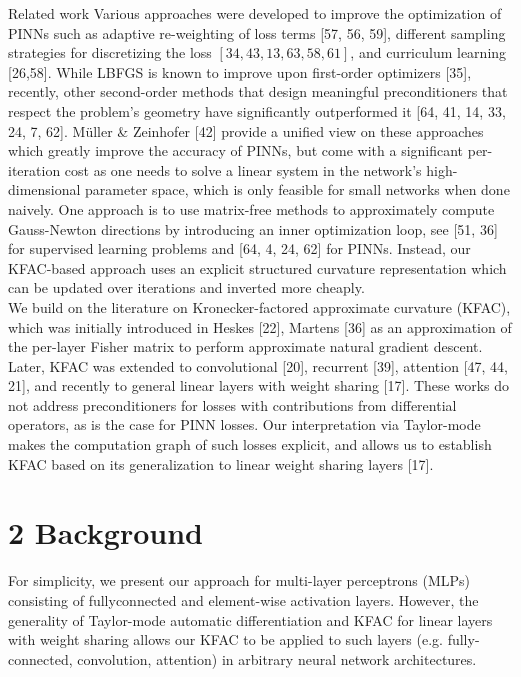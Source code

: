 \documentclass[10pt]{article}
\begin{document}
Related work Various approaches were developed to improve the optimization of PINNs such as adaptive re-weighting of loss terms [57, 56, 59], different sampling strategies for discretizing the loss $[34,43,13,63,58,61]$, and curriculum learning [26,58]. While LBFGS is known to improve upon first-order optimizers [35], recently, other second-order methods that design meaningful preconditioners that respect the problem's geometry have significantly outperformed it [64, 41, 14, 33, 24, 7, 62]. Müller \& Zeinhofer [42] provide a unified view on these approaches which greatly improve the accuracy of PINNs, but come with a significant per-iteration cost as one needs to solve a linear system in the network's high-dimensional parameter space, which is only feasible for small networks when done naively. One approach is to use matrix-free methods to approximately compute Gauss-Newton directions by introducing an inner optimization loop, see [51, 36] for supervised learning problems and [64, 4, 24, 62] for PINNs. Instead, our KFAC-based approach uses an explicit structured curvature representation which can be updated over iterations and inverted more cheaply.\\[0pt]
We build on the literature on Kronecker-factored approximate curvature (KFAC), which was initially introduced in Heskes [22], Martens [36] as an approximation of the per-layer Fisher matrix to perform approximate natural gradient descent. Later, KFAC was extended to convolutional [20], recurrent [39], attention [47, 44, 21], and recently to general linear layers with weight sharing [17]. These works do not address preconditioners for losses with contributions from differential operators, as is the case for PINN losses. Our interpretation via Taylor-mode makes the computation graph of such losses explicit, and allows us to establish KFAC based on its generalization to linear weight sharing layers [17].

\section*{2 Background}
For simplicity, we present our approach for multi-layer perceptrons (MLPs) consisting of fullyconnected and element-wise activation layers. However, the generality of Taylor-mode automatic differentiation and KFAC for linear layers with weight sharing allows our KFAC to be applied to such layers (e.g. fully-connected, convolution, attention) in arbitrary neural network architectures.
\end{document}
